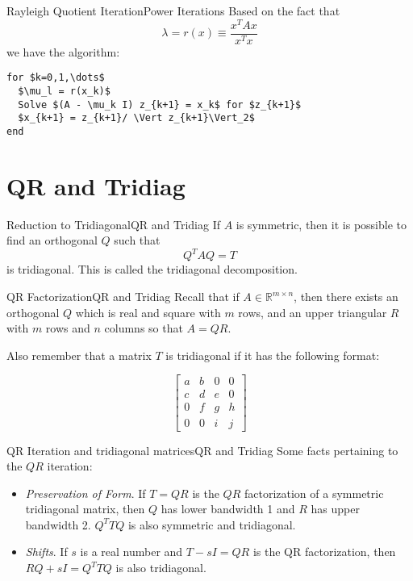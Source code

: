 \documentclass{beamer}
\begin{document}
\begin{frame}[fragile]{Rayleigh Quotient Iteration}{Power Iterations}
Based on the fact that
\[\lambda = r(x) \equiv \dfrac{x^T Ax}{x^T x}\]
\pause
we have the algorithm:
\begin{lstlisting}[mathescape=true]
for $k=0,1,\dots$
  $\mu_l = r(x_k)$
  Solve $(A - \mu_k I) z_{k+1} = x_k$ for $z_{k+1}$
  $x_{k+1} = z_{k+1}/ \Vert z_{k+1}\Vert_2$
end
\end{lstlisting}
\end{frame}

\section{QR and Tridiag}

\begin{frame}{Reduction to Tridiagonal}{QR and Tridiag}
If $A$ is symmetric, then it is possible to find an orthogonal $Q$ such that
\[Q^T A Q = T\]
 is tridiagonal. This is called the \alert{tridiagonal decomposition}.
\end{frame}

\begin{frame}{QR Factorization}{QR and Tridiag}
Recall that if $A \in \mathbb{R}^{m \times n}$, then there exists an orthogonal $Q$ which is real and square with $m$ rows, and an upper triangular $R$ with $m$ rows and $n$ columns so that $A = QR$.

\pause

Also remember that a matrix $T$ is tridiagonal if it has the following format:

\[
\left[
\begin{array}{cccc}
a & b & 0 & 0 \\
c & d & e & 0 \\
0 & f & g & h \\
0 & 0 & i & j
\end{array}
\right]
\]

\end{frame}

\begin{frame}{QR Iteration and tridiagonal matrices}{QR and Tridiag}
Some facts pertaining to the $QR$ iteration:

\begin{itemize}
  \item \textit{Preservation of Form}. If $T = QR$ is the $QR$ factorization of a symmetric tridiagonal matrix, then $Q$ has lower bandwidth 1 and $R$ has upper bandwidth 2. $Q^T T Q$ is also symmetric and tridiagonal.

  \item \textit{Shifts}. If $s$ is a real number and $T - sI = QR$ is the QR factorization, then $RQ + sI = Q^TTQ$ is also tridiagonal.
\end{itemize}
\end{frame}
\end{document}
